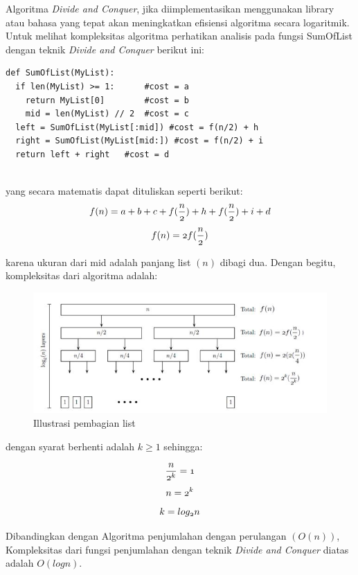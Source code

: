 \documentclass[12pt]{book}%
\begin{document}
Algoritma \textit{Divide and Conquer}, jika diimplementasikan menggunakan library atau bahasa yang tepat akan meningkatkan efisiensi algoritma secara logaritmik. Untuk melihat kompleksitas algoritma perhatikan analisis pada fungsi SumOfList dengan teknik \textit{Divide and Conquer} berikut ini:

\lstset{language=Python}
\label{lst:DivideAndConquerSum}
\begin{lstlisting}[frame=single]
def SumOfList(MyList):
  if len(MyList) >= 1:		#cost = a 
    return MyList[0]		#cost = b 
	mid = len(MyList) // 2	#cost = c
  left = SumOfList(MyList[:mid]) #cost = f(n/2) + h
  right = SumOfList(MyList[mid:]) #cost = f(n/2) + i
  return left + right	#cost = d
	
\end{lstlisting}

yang secara matematis dapat dituliskan seperti berikut:
$$	  \mathnormal{f(n) = a+b+c+f(\frac{n}{2})+h+f(\frac{n}{2})+i+d } $$
$$	  \mathnormal{f(n) = 2f(\frac{n}{2})} $$

karena ukuran dari mid adalah panjang list $(n)$ dibagi dua. Dengan begitu, kompleksitas dari algoritma adalah:

\begin{figure}[htbp]
\begin{center}
	\includegraphics[scale=0.8]{fig/sunario-3/fn.jpg}%
	\caption{Illustrasi pembagian list}%
	\label{fig:PembagianList}%
\end{center}
\end{figure}

dengan syarat berhenti adalah $k \geq 1$ sehingga:

$$	  \mathnormal{ \frac{n}{2^{k}}=1} $$
$$	  \mathnormal{n=2^{k}} $$
$$	  \mathnormal{k=log_{2}n} $$

Dibandingkan dengan Algoritma penjumlahan dengan perulangan $(O(n))$, Kompleksitas dari fungsi penjumlahan dengan teknik \textit{Divide and Conquer} diatas adalah $O(log n)$.
\end{document}

